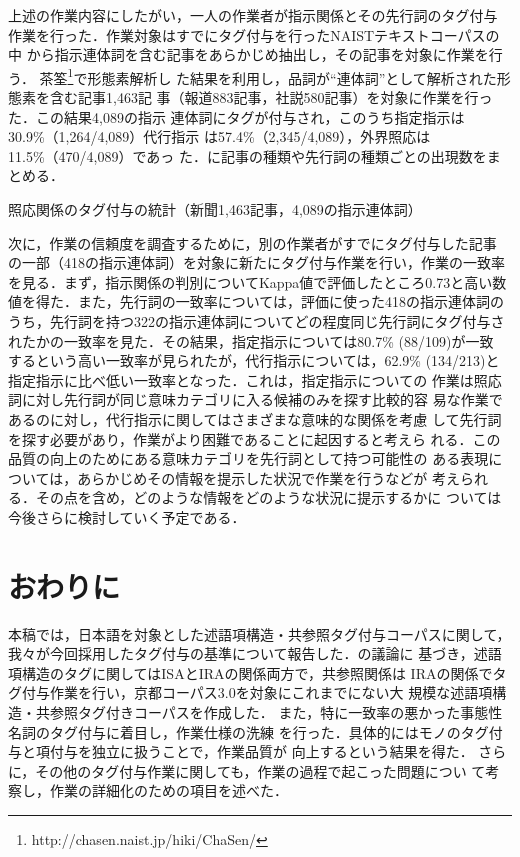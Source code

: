 \documentclass[japanese]{jnlp_1.4}
\def\sec#1{}
\def\tab#1{}
\begin{document}
上述の作業内容にしたがい，一人の作業者が指示関係とその先行詞のタグ付与
作業を行った．作業対象はすでにタグ付与を行ったNAISTテキストコーパスの中
から指示連体詞を含む記事をあらかじめ抽出し，その記事を対象に作業を行う．
茶筌\footnote{http://chasen.naist.jp/hiki/ChaSen/}で形態素解析し
た結果を利用し，品詞が``連体詞''として解析された形態素を含む記事1,463記
事（報道883記事，社説580記事）を対象に作業を行った．この結果4,089の指示
連体詞にタグが付与され，このうち指定指示は30.9\%（1,264/4,089）代行指示
は57.4\%（2,345/4,089），外界照応は11.5\%（470/4,089）であっ
た．\tab{ana_table}に記事の種類や先行詞の種類ごとの出現数をまとめる．

\begin{table}[b]
  \caption{照応関係のタグ付与の統計（新聞1,463記事，4,089の指示連体詞）}
  \label{tab:ana_table}

\end{table}

次に，作業の信頼度を調査するために，別の作業者がすでにタグ付与した記事
の一部（418の指示連体詞）を対象に新たにタグ付与作業を行い，作業の一致率
を見る．まず，指示関係の判別についてKappa値で評価したところ0.73と高い数
値を得た．また，先行詞の一致率については，評価に使った418の指示連体詞の
うち，先行詞を持つ322の指示連体詞についてどの程度同じ先行詞にタグ付与さ
れたかの一致率を見た．その結果，指定指示については80.7\% (88/109)が一致
するという高い一致率が見られたが，代行指示については，62.9\%
(134/213)と指定指示に比べ低い一致率となった．これは，指定指示についての
作業は照応詞に対し先行詞が同じ意味カテゴリに入る候補のみを探す比較的容
易な作業であるのに対し，代行指示に関してはさまざまな意味的な関係を考慮
して先行詞を探す必要があり，作業がより困難であることに起因すると考えら
れる．この品質の向上のためにある意味カテゴリを先行詞として持つ可能性の
ある表現については，あらかじめその情報を提示した状況で作業を行うなどが
考えられる．その点を含め，どのような情報をどのような状況に提示するかに
ついては今後さらに検討していく予定である．



\section{おわりに}
\label{sec:seventh}

本稿では，日本語を対象とした述語項構造・共参照タグ付与コーパスに関して，
我々が今回採用したタグ付与の基準について報告した．\sec{third}の議論に
基づき，述語項構造のタグに関してはISAとIRAの関係両方で，共参照関係は
IRAの関係でタグ付与作業を行い，京都コーパス3.0を対象にこれまでにない大
規模な述語項構造・共参照タグ付きコーパスを作成した．
また，特に一致率の悪かった事態性名詞のタグ付与に着目し，作業仕様の洗練
を行った．具体的にはモノのタグ付与と項付与を独立に扱うことで，作業品質が
向上するという結果を得た．
さらに，その他のタグ付与作業に関しても，作業の過程で起こった問題につい
て考察し，作業の詳細化のための項目を述べた．
\end{document}
